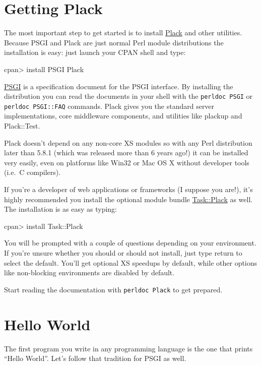 \chapter{Getting Plack}\label{day-1-getting-plack}

The most important step to get started is to install
\href{http://search.cpan.org/dist/Plack}{Plack} and other utilities.
Because PSGI and Plack are just normal Perl module distributions the
installation is easy: just launch your CPAN shell and type:

\begin{shell}
cpan> install PSGI Plack
\end{shell}

\href{http://search.cpan.org/dist/PSGI}{PSGI} is a specification
document for the PSGI interface. By installing the distribution you can
read the documents in your shell with the \lstinline!perldoc PSGI! or
\lstinline!perldoc PSGI::FAQ! commands. Plack gives you the standard
server implementations, core middleware components, and utilities like
plackup and Plack::Test.

Plack doesn't depend on any non-core XS modules so with any Perl
distribution later than 5.8.1 (which was released more than 6 years
ago!) it can be installed very easily, even on platforms like Win32 or
Mac OS X without developer tools (i.e.~C compilers).

If you're a developer of web applications or frameworks (I suppose you
are!), it's highly recommended you install the optional module bundle
\href{http://search.cpan.org/dist/Task-Plack}{Task::Plack} as well. The
installation is as easy as typing:

\begin{shell}
cpan> install Task::Plack
\end{shell}

You will be prompted with a couple of questions depending on your
environment. If you're unsure whether you should or should not install,
just type return to select the default. You'll get optional XS speedups
by default, while other options like non-blocking environments are
disabled by default.

Start reading the documentation with \lstinline!perldoc Plack! to get
prepared.

\chapter{Hello World}\label{day-2-hello-world}

The first program you write in any programming language is the one that
prints ``Hello World''. Let's follow that tradition for PSGI as well.

